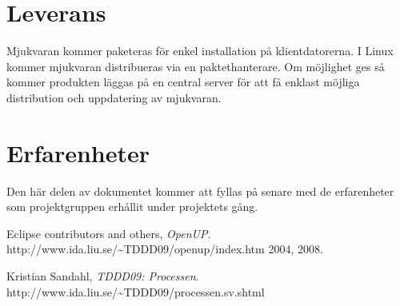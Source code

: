 \section{Leverans}
Mjukvaran kommer paketeras för enkel installation på klientdatorerna. I Linux kommer mjukvaran distribueras via en paktethanterare. Om möjlighet ges så kommer produkten läggas på en central server för att få enklast möjliga distribution och uppdatering av mjukvaran.

\section{Erfarenheter}
Den här delen av dokumentet kommer att fyllas på senare med de erfarenheter som projektgruppen erhållit under projektets gång.

\newpage

\begin{thebibliography}{9}
	Eclipse contributors and others,
	\emph{OpenUP}.
	http://www.ida.liu.se/\~{}TDDD09/openup/index.htm
	2004, 2008.

	Kristian Sandahl,
	\emph{TDDD09: Processen}.
	http://www.ida.liu.se/\~{}TDDD09/processen.sv.shtml
\end{thebibliography}




